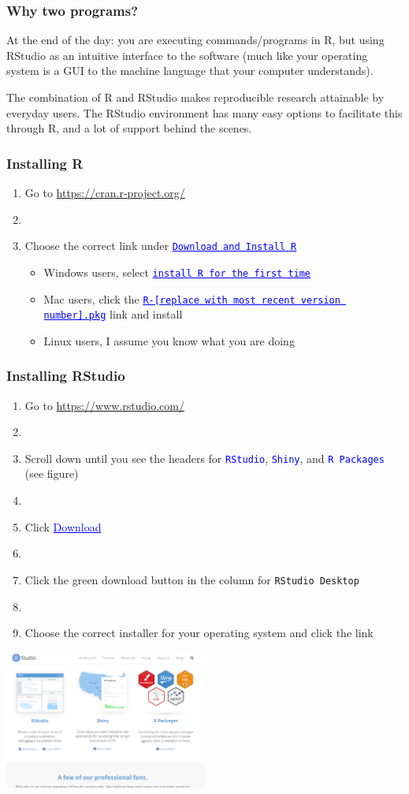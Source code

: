 \documentclass[11pt]{beamer}
\newcommand{\myframe}[1]{\begin{frame} \frametitle{#1}}
\newenvironment{spaceitemize}
{ \begin{itemize}
    \setlength{\itemsep}{10pt}
    \setlength{\parskip}{0pt}
    \setlength{\parsep}{0pt}     }
{ \end{itemize}                  }
\begin{document}
\myframe{Why two programs?}
At the end of the day: you are executing commands/programs in R, but using RStudio as an intuitive interface to the software (much like your operating system is a GUI to the machine language that your computer understands). \pause

The combination of R and RStudio makes reproducible research attainable by everyday users. The RStudio environment has many easy options to facilitate this through R, and a lot of support behind the scenes.


\end{frame}

\myframe{Installing R}
\begin{enumerate}
\item Go to \url{https://cran.r-project.org/}
\item[] \pause
\item Choose the correct link under \textcolor{blue}{\underline{\texttt{Download and Install R}}} \pause
\begin{spaceitemize}
\item Windows users, select \textcolor{blue}{\underline{\texttt{install R for the first time}}}
\item Mac users, click the \textcolor{blue}{\underline{\texttt{R-[replace with most recent version number].pkg}}} link and install
\item Linux users, I assume you know what you are doing
\end{spaceitemize}
\end{enumerate}

\end{frame}

\myframe{Installing RStudio}
\begin{enumerate}
\item Go to \url{https://www.rstudio.com/}
\item[] \pause
\item Scroll down until you see the headers for \textcolor{blue}{\texttt{RStudio}}, \textcolor{blue}{\texttt{Shiny}}, and \textcolor{blue}{\texttt{R Packages}}  (see figure) \pause
\item[]
\item Click \textcolor{blue}{\underline{Download}}
\item[] \pause
\item Click the green download button in the column for \texttt{RStudio Desktop}
\item[] \pause
\item Choose the correct installer for your operating system and click the link
\end{enumerate}
\centering
\includegraphics[width = 0.5\textwidth]{figs/rstudio_download.png}
\end{frame}
\end{document}
